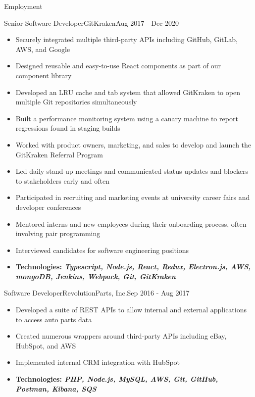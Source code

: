 \documentclass[]{mcdowellcv}
\begin{document}
	\makeheader

	\begin{cvsection}{Employment}
		\begin{cvsubsection}{Senior Software Developer}{GitKraken}{Aug 2017 - Dec 2020}
			\begin{itemize}
				\item Securely integrated multiple third-party APIs including GitHub, GitLab, AWS, and Google
				\item Designed reusable and easy-to-use React components as part of our component library
				\item Developed an LRU cache and tab system that allowed GitKraken to open multiple Git repositories simultaneously
				\item Built a performance monitoring system using a canary machine to report regressions found in staging builds
				\item Worked with product owners, marketing, and sales to develop and launch the GitKraken Referral Program
				\item Led daily stand-up meetings and communicated status updates and blockers to stakeholders early and often
				\item Participated in recruiting and marketing events at university career fairs and developer conferences
				\item Mentored interns and new employees during their onboarding process, often involving pair programming
				\item Interviewed candidates for software engineering positions
				\item \textbf{Technologies: \emph{Typescript, Node.js, React, Redux, Electron.js, AWS, mongoDB, Jenkins, Webpack, Git, GitKraken}}
			\end{itemize}
		\end{cvsubsection}

		\begin{cvsubsection}{Software Developer}{RevolutionParts, Inc.}{Sep 2016 - Aug 2017}
			\begin{itemize}
				\item Developed a suite of REST APIs to allow internal and external applications to access auto parts data
				\item Created numerous wrappers around third-party APIs including eBay, HubSpot, and AWS
				\item Implemented internal CRM integration with HubSpot
				\item \textbf{Technologies: \emph{PHP, Node.js, MySQL, AWS, Git, GitHub, Postman, Kibana, SQS}}
			\end{itemize}
		\end{cvsubsection}


\end{cvsection}
\end{document}
